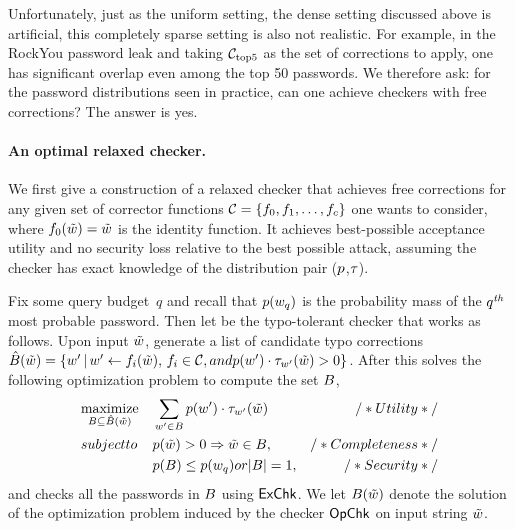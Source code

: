 Unfortunately, just as the uniform setting, the dense setting discussed above is
artificial, 
this completely sparse setting is also not realistic.   For
example, in the RockYou password leak and taking ${\mathcal C}_{\textrm{top5}}$ as the set of
corrections to apply, one has significant overlap even among the  top 50
passwords. We therefore ask: for the password distributions seen in practice, 
can one achieve checkers with free corrections? The answer is yes.


\paragraph{An optimal relaxed checker.} We first give a construction
of a relaxed checker that achieves free corrections for any given set
of corrector functions ${\mathcal C} = \{f_0, f_1,\ldots,f_c\}$
one wants to consider, where $f_0(\tilde{w})=\tilde{w}$ is the identity
function.  It achieves best-possible acceptance utility and no
security loss relative to the best possible attack, assuming the
checker has exact knowledge of the distribution pair
($p$,$\tau$).

Fix some query budget~$q$ and recall that $p({w}_q)$ is the
probability mass of the $q^{\textit{th}}$ most probable password.  Then let
\opchecker be the typo-tolerant checker that works as follows. Upon
input $\tilde{w}$, generate a list of candidate typo corrections
$\hat{B}(\tilde{w}) = \{{w}'\,|\,{w}' \leftarrow
f_i(\tilde{w}),\,f_i\in{\mathcal C}, \relax{ and }
p({w}')\cdot\tau_{{w}'}(\tilde{w})>0\}$.
After this \opchecker solves the following optimization problem to
compute the set $B$,
\begin{equation*}\label{eq:constraints}
  \begin{aligned}
    &\underset{\ball\subseteq \hat{\ball}(\pwtypo)}{\text{maximize}} && \sum_{\pw'\in \ball} \pwprob(\pw')\cdot\typoprob_{\pw'}(\pwtypo)&\mbox{/* Utility */}\\
    &\mbox{subject to } && \pwprob(\pwtypo) > 0  \Rightarrow \pwtypo \in \ball,&\mbox{/* Completeness */}\\
    & && \pwprob(\ball)\le\pwprob(\pw_q) \mbox{ or } |\ball| = 1, &\hfill\mbox{/* Security */}
  \end{aligned}
\end{equation*}
and checks all the passwords in $B$
  using $\textnormal{\textsf{ExChk}}$.  We let $B(\tilde{w})$ denote the solution of
  the optimization problem induced by the checker $\textnormal{\textsf{OpChk}}$ on
  input string $\tilde{w}$.

